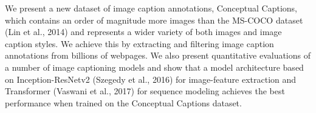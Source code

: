 We present a new dataset of image caption annotations, Conceptual Captions, which contains an order of magnitude more images than the MS-COCO dataset (Lin et al., 2014) and represents a wider variety of both images and image caption styles. We achieve this by extracting and filtering image caption annotations from billions of webpages. We also present quantitative evaluations of a number of image captioning models and show that a model architecture based on Inception-ResNetv2 (Szegedy et al., 2016) for image-feature extraction and Transformer (Vaswani et al., 2017) for sequence modeling achieves the best performance when trained on the Conceptual Captions dataset.
